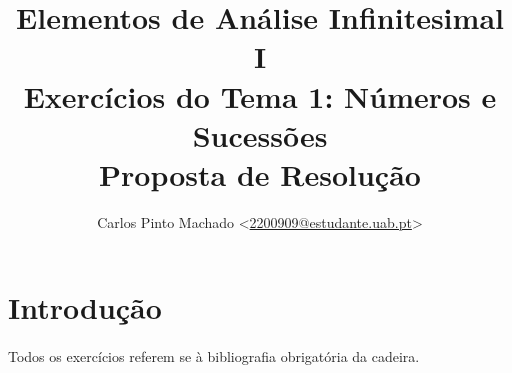 \documentclass[11pt, a4paper]{article}
\title{
	Elementos de Análise Infinitesimal I\\
	Exercícios do Tema 1: Números e Sucessões\\
	Proposta de Resolução
}
\author{
	Carlos Pinto Machado
	<\href{mailto:2200909@estudante.uab.pt}{2200909@estudante.uab.pt}>
}
\begin{document}
\maketitle
\tableofcontents

\clearpage

\section*{Introdução}
{}

\paragraph{} Todos os exercícios referem se à bibliografia obrigatória da
cadeira\parencite{Santos2016}.


%
%
%

\clearpage

\printbibliography[title={Bibliografia},heading=bibintoc]
\end{document}
